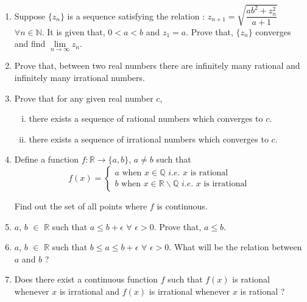 \documentclass[11pt, a4paper]{article}
\begin{document}
\begin{enumerate}
	\item Suppose $\{z_n\}$ is a sequence satisfying the relation : $z_{n+1} = \sqrt{\dfrac{ab^2 + z_n^2}{a+1}}$ $\forall n \in \mathbb{N}$. It is given that, $0 < a < b$ and $z_1 = a$. Prove that, $\{z_n\}$ converges and find $\lim \limits_{n \rightarrow \infty} z_n$.
	
	\item Prove that, between two real numbers there are infinitely many rational and infinitely many irrational numbers.
	
	\item Prove that for any given real number $c$,
	\begin{enumerate}[(i)]
	\item there exists a sequence of rational numbers which converges to $c$.
	\item there exists a sequence of irrational numbers which converges to $c$.
	\end{enumerate}
	
	\item Define a function $f : \mathbb{R} \rightarrow \{a, b\}$, $a \neq b$ such that
	\begin{equation*}
	f(x) =
		\begin{cases}
		a \text{ when } x \in \mathbb{Q} \textit{ i.e. } x \text{ is rational} \\
		b \text{ when } x \in \mathbb{R \backslash Q} \textit{ i.e. } x \text{ is irrational }
		\end{cases}	
	\end{equation*}
	
Find out the set of all points where $f$ is continuous.

	\item $a$, $b$ $\in$ $\mathbb{R}$ such that $a \leq b + \epsilon $ $\forall$ $\epsilon > 0$. Prove that, $a \leq b$.
	
	\item $a$, $b$ $\in$ $\mathbb{R}$ such that $b \leq a \leq b + \epsilon$ $\forall$ $\epsilon > 0$. What will be the relation between $a$ and $b$ ?
	
	\item Does there exist a continuous function $f$ such that $f(x)$ is rational whenever $x$ is irrational and $f(x)$ is irrational whenever $x$ is rational ?
\end{enumerate}
\end{document}
